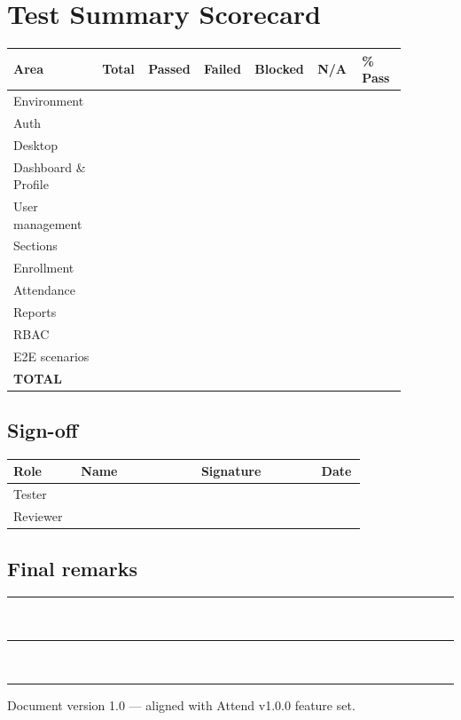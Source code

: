 \documentclass[11pt,a4paper,oneside]{article}
\newcommand{\fillinlong}{\rule{0.72\textwidth}{0.4pt}}
\begin{document}
\section{Test Summary Scorecard}

\small
\begin{tabular}{@{}>{\raggedright\arraybackslash}p{0.22\linewidth} >{\centering\arraybackslash}p{0.11\linewidth} >{\centering\arraybackslash}p{0.11\linewidth} >{\centering\arraybackslash}p{0.11\linewidth} >{\centering\arraybackslash}p{0.11\linewidth} >{\centering\arraybackslash}p{0.11\linewidth} >{\centering\arraybackslash}p{0.11\linewidth}@{}}
  \toprule
  \textbf{Area} & \textbf{Total} & \textbf{Passed} & \textbf{Failed} & \textbf{Blocked} & \textbf{N/A} & \textbf{\% Pass} \\
  \midrule
  Environment           & & & & & & \\
  Auth                  & & & & & & \\
  Desktop               & & & & & & \\
  Dashboard \& Profile  & & & & & & \\
  User management       & & & & & & \\
  Sections              & & & & & & \\
  Enrollment            & & & & & & \\
  Attendance            & & & & & & \\
  Reports               & & & & & & \\
  RBAC                  & & & & & & \\
  E2E scenarios         & & & & & & \\
  \midrule
  \textbf{TOTAL}        & & & & & & \\
  \bottomrule
\end{tabular}
\normalsize

\subsection{Sign-off}

\small
\begin{tabular}{@{}>{\raggedright\arraybackslash}p{0.18\linewidth} >{\raggedright\arraybackslash}p{0.32\linewidth} >{\raggedright\arraybackslash}p{0.32\linewidth} >{\raggedright\arraybackslash}p{0.12\linewidth}@{}}
  \toprule
  \textbf{Role} & \textbf{Name} & \textbf{Signature} & \textbf{Date} \\
  \midrule
  Tester   & & & \\
  Reviewer & & & \\
  \bottomrule
\end{tabular}
\normalsize

\subsection{Final remarks}

\fillinlong\\[0.6cm]
\fillinlong\\[0.6cm]
\fillinlong

\vfill
\begin{center}
  \small\color{AttendGray}
  Document version 1.0 --- aligned with Attend v1.0.0 feature set.
\end{center}
\end{document}
